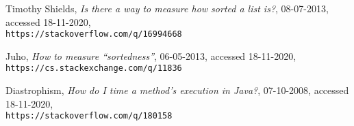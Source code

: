 \documentclass{article}
\begin{document}
\begin{thebibliography}{10}
Timothy Shields, \textit{Is there a way to measure how sorted a list is?}, 08-07-2013, accessed 18-11-2020, \\\texttt{https://stackoverflow.com/q/16994668}

Juho, \textit{How to measure “sortedness”}, 06-05-2013, accessed 18-11-2020, \\\texttt{https://cs.stackexchange.com/q/11836}

Diastrophism, \textit{How do I time a method's execution in Java?}, 07-10-2008, accessed 18-11-2020, \\\texttt{https://stackoverflow.com/q/180158}

\end{thebibliography}
\end{document}

